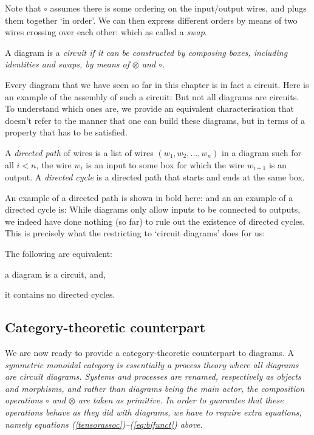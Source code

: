 \documentclass[12pt]{article}
\begin{document}
Note that $\circ$ assumes there is some ordering on the input/output wires, and plugs them together `in order'. We can then express different orders by means of two wires crossing over each other:
which as called a \textit{swap}.

\begin{definition} 
A diagram is a  \em circuit \em  if it  can be constructed  by composing boxes, including identities and swaps, by means of $\otimes$ and $\circ$.
\end{definition}

Every diagram that we have seen so far in this chapter is in fact a circuit.    Here is an example of the assembly of such a circuit:
But not all diagrams are circuits. To understand  which ones are, we provide an equivalent characterisation that doesn't refer to the manner that one can build these diagrams, but in terms of a property that has to be satisfied.  

\begin{definition}
  A \textit{directed path} of wires is a list of wires $(w_1, w_2, \ldots, w_n)$ in a diagram such for all $i < n$, the wire $w_i$ is an input to some box for which 
  the wire $w_{i+1}$ is an output.   A \textit{directed cycle} is a directed path that starts and ends at the same box. 
\end{definition}

An example of a directed path is shown in bold here:
and an an example of a directed cycle is:
While diagrams only allow inputs to be connected to outputs, we indeed have done nothing (so far) to rule out the existence of directed cycles. This is precisely what the restricting to `circuit diagrams' does for us:  

\begin{theorem}\label{thm:circuit-acyclic}
The following are equivalent:
\bit
\item a diagram is a circuit, and, 
\item it contains no directed cycles.
\eit
\end{theorem}

\subsection{Category-theoretic counterpart}

We are now ready to provide a category-theoretic counterpart to diagrams.  A  \em symmetric monoidal category \em is essentially a process theory where all diagrams are circuit diagrams. Systems and processes are renamed, respectively as \em objects \em  and \em morphisms\em, and rather than diagrams being the main actor, the composition operations $\circ$ and $\otimes$ are taken as primitive. In order to guarantee that these operations behave as they did with diagrams, we have to require extra equations, namely equations (\ref{tensorassoc})--(\ref{eq:bifunct}) above.
\end{document}
